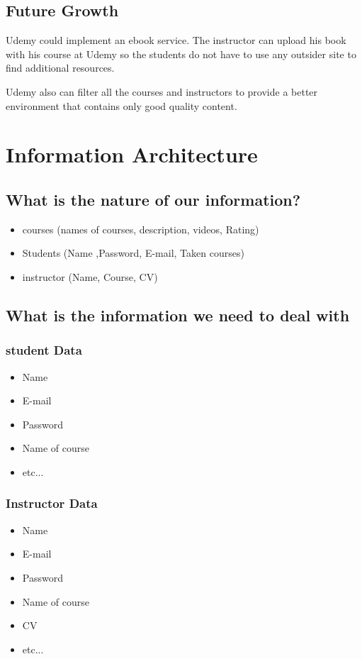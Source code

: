 \documentclass{book}
\begin{document}
	\section{Future Growth}
	Udemy could implement an ebook service. The instructor can upload his book with his course at Udemy so the students do not have to use any outsider site to find additional resources.
	
	Udemy also can filter all the courses and instructors to provide a better environment that contains only good quality content.
	
	\chapter{Information Architecture}
	\section{What is the nature of our information?}
	\begin{itemize}
	\item courses (names of courses, description, videos, Rating)
	\item Students (Name ,Password, E-mail, Taken courses)
	\item instructor (Name, Course, CV)	
\end{itemize}
\section{What is the information we need to deal with}
\subsection{student Data}
\begin{itemize}
	\item Name
	\item E-mail
	\item Password
	\item Name of course 
	\item etc...
\end{itemize}

\subsection{Instructor  Data}
\begin{itemize}
	\item Name
	\item E-mail
	\item Password
	\item Name of course 
	\item CV
	\item etc...
\end{itemize}
\end{document}
